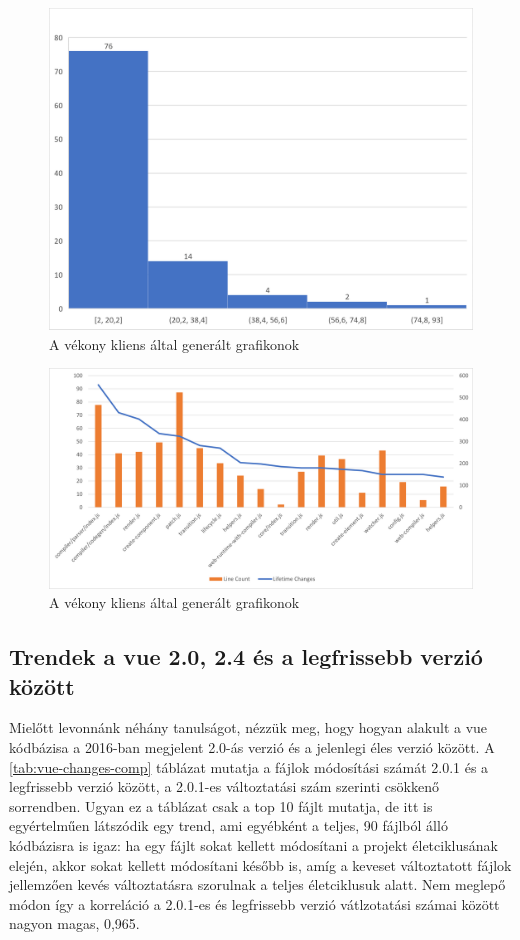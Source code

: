 \begin{figure}[H]
    \centering
    \includegraphics[width=1\textwidth]{images/vue/vue2-hist.png}
    \caption{A vékony kliens által generált grafikonok}
    \label{fig:hestia-charts}
\end{figure}

\begin{figure}[H]
    \centering
    \includegraphics[width=1\textwidth]{images/vue/vue2-lines-lifetimechanges.png}
    \caption{A vékony kliens által generált grafikonok}
    \label{fig:hestia-charts}
\end{figure}

\subsection{Trendek a vue 2.0, 2.4 és a legfrissebb verzió között}

Mielőtt levonnánk néhány tanulságot, nézzük meg, hogy hogyan alakult a vue kódbázisa a 2016-ban megjelent 2.0-ás verzió és a jelenlegi éles verzió között. A \ref{tab:vue-changes-comp} táblázat mutatja a fájlok módosítási számát 2.0.1 és a legfrissebb verzió között, a 2.0.1-es változtatási szám szerinti csökkenő sorrendben. Ugyan ez a táblázat csak a top 10 fájlt mutatja, de itt is egyértelműen látszódik egy trend, ami egyébként a teljes, 90 fájlból álló kódbázisra is igaz: ha egy fájlt sokat kellett módosítani a projekt életciklusának elején, akkor sokat kellett módosítani később is, amíg a keveset változtatott fájlok jellemzően kevés változtatásra szorulnak a teljes életciklusuk alatt. Nem meglepő módon így a korreláció a 2.0.1-es és legfrissebb verzió vátlzotatási számai között nagyon magas, 0,965.

